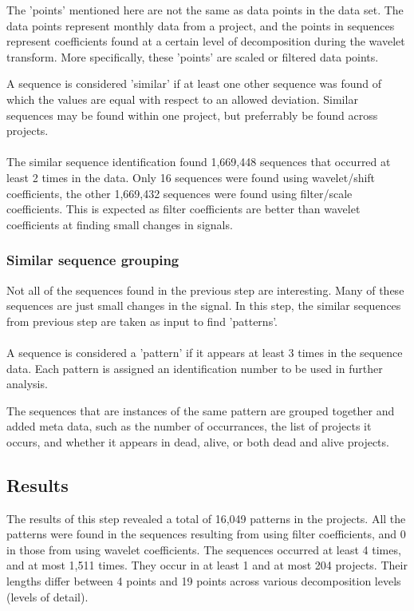 The 'points' mentioned here are not the same as data points in the data set.
The data points represent monthly data from a project, and the points in
sequences represent coefficients found at a certain level of decomposition
during the wavelet transform. More specifically, these 'points' are scaled or
filtered data points.

A sequence is considered 'similar' if at least one other sequence was found of
which the values are equal with respect to an allowed deviation. Similar
sequences may be found within one project, but preferrably be found across
projects.

\paragraph{}
The similar sequence identification found 1,669,448 sequences that occurred
at least 2 times in the data. Only 16 sequences were found using wavelet/shift
coefficients, the other 1,669,432 sequences were found using filter/scale
coefficients. This is expected as filter coefficients are better than wavelet
coefficients at finding small changes in signals.

\subsubsection{Similar sequence grouping}
\label{def:pattern}
Not all of the sequences found in the previous step are interesting. Many of
these sequences are just small changes in the signal. In this step, the similar
sequences from previous step are taken as input to find 'patterns'.

\paragraph{}
A sequence is considered a 'pattern' if it appears at least 3 times in the
sequence data. Each pattern is assigned an identification number to be used in
further analysis.

The sequences that are instances of the same pattern are grouped together and
added meta data, such as the number of occurrances, the list of projects
it occurs, and whether it appears in dead, alive, or both dead and alive
projects.

\subsection{Results}
The results of this step revealed a total of 16,049 patterns in the projects.
All the patterns were found in the sequences resulting from using filter
coefficients, and 0 in those from using wavelet coefficients. The sequences
occurred at least 4 times, and at most 1,511 times. They occur in at least 1
and at most 204 projects. Their lengths differ between 4 points and 19 points
across various decomposition levels (levels of detail).

